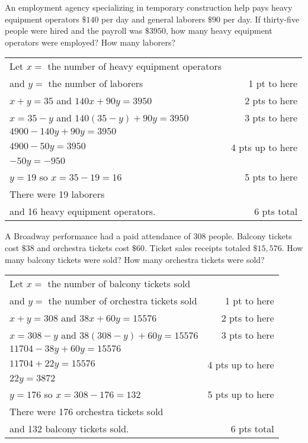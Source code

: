 {
	An employment agency specializing in temporary construction help pays heavy equipment operators $\$140$ per day and general laborers $\$90$ per day. If thirty-five people were hired and the payroll was $\$3950$, how many heavy equipment operators were employed? How many laborers?
}
{
	\begin{tabular}{l r}
	Let $x =$ the number of heavy equipment operators\\ 
	and $y =$ the number of laborers & 1 pt to here\\
	$x + y = 35$ and   $140x + 90y = 3950$ &  2 pts to here\\
	$x = 35 - y$ and  $140(35 - y) +90y =3950$  & 3 pts to here\\
	$4900 - 140y + 90y = 3950$\\
	$4900-50y  = 3950$ &  4 pts up to here\\
	$-50y  = -950$\\
	$y = 19 $ so $x =35-19=16$ & 5 pts to here\\
	There were 19 laborers\\  and 16 heavy equipment operators.  & 6 pts total\\ 
	\end{tabular}
}

{
	A Broadway performance had a paid attendance of 308 people. Balcony tickets cost $\$38$ and orchestra tickets cost $\$60$. Ticket sales receipts totaled $\$15,\!576$. How many balcony tickets were sold? How many orchestra tickets were sold?
}
{
	\begin{tabular}{l r}
	Let $x =$ the number of balcony tickets sold\\ 
	and $y =$ the number of orchestra tickets sold & 1 pt to here\\
	$x + y = 308$     and   $38x + 60y = 15576$ & 2 pts to here\\
	$x = 308 - y$ and    $38(308 - y) +60y =15576$ & 3 pts to here\\
	$11704 - 38y + 60y = 15576$\\
	$11704 + 22y  = 15576$ & 4 pts up to here\\
	$22y  = 3872$\\
	$y = 176$ so $x =308-176=132$ & 5 pts up to here \\
	There were 176 orchestra tickets sold \\and 132 balcony tickets sold.  & 6 pts total\\
	\end{tabular}
}

